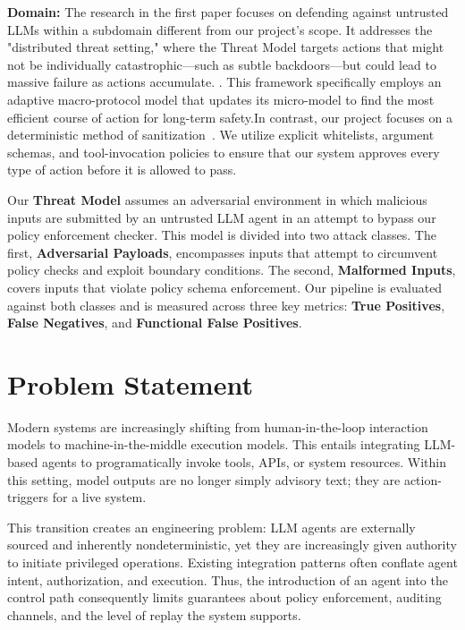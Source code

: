 \documentclass[conference]{IEEEtran}
\begin{document}
\textbf{Domain: }
The research in the first paper focuses on defending against untrusted LLMs within a subdomain different from our project’s scope. It addresses the "distributed threat setting," where the Threat Model targets actions that might not be individually catastrophic—such as subtle backdoors—but could lead to massive failure as actions accumulate. \cite{wen2024adaptivedeploymentuntrustedllms}. This framework specifically employs an adaptive\textbf{ }macro-protocol model that updates its micro-model to find the most efficient course of action for long-term safety.In contrast, our project focuses on a deterministic\textbf{ }method of sanitization~\cite{watson2010capsicum}. We utilize explicit\textbf{ }whitelists, argument schemas, and tool-invocation policies to ensure that our system approves every type of action before it is allowed to pass. 

Our \textbf{Threat Model} assumes an adversarial environment in which malicious inputs 
are submitted by an untrusted LLM agent in an attempt to bypass our policy 
enforcement checker. This model is divided into two attack classes. The first, 
\textbf{Adversarial Payloads}, encompasses inputs that attempt to circumvent 
policy checks and exploit boundary conditions. The second, \textbf{Malformed 
Inputs}, covers inputs that violate policy schema enforcement. Our pipeline is 
evaluated against both classes and is measured across three key metrics: 
\textbf{True Positives}, \textbf{False Negatives}, and \textbf{Functional 
False Positives}.


\section{Problem Statement}

Modern systems are increasingly shifting from human-in-the-loop interaction models to machine-in-the-middle execution models. This entails integrating LLM-based agents to programatically invoke tools, APIs, or system resources. Within this setting, model outputs are no longer simply advisory text; they are action-triggers for a live system. 

This transition creates an engineering problem: LLM agents are externally sourced and inherently nondeterministic, yet they are increasingly given authority to initiate privileged operations. Existing integration patterns often conflate agent intent, authorization, and execution. Thus, the introduction of an agent into the control path consequently limits guarantees about policy enforcement, auditing channels, and the level of replay the system supports.
\end{document}
